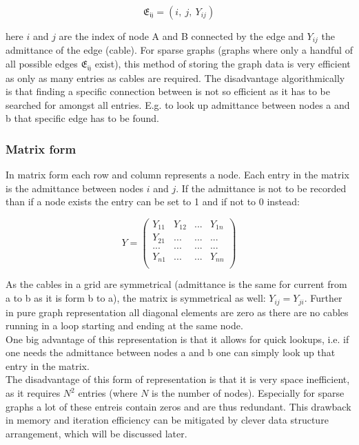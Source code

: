 \begin{equation}    
    \mathfrak{E_{ij}} = (i,\ j,\ Y_{ij})
    \label{eq:graph_theory:edge_list}
\end{equation}

here $i$ and $j$ are the index of node A and B connected by the edge and
$Y_{ij}$ the admittance of the edge (cable).
For sparse graphs (graphs where only a handful of all possible edges $\mathfrak{E_{ij}}$ exist), this method
of storing the graph data is very efficient as only as many entries as cables are required. The disadvantage
algorithmically is that finding a specific connection between is not so efficient as it has to be searched for amongst
all entries. E.g. to look up admittance between nodes a and b that specific edge has to be found.

\subsubsection{Matrix form}

In matrix form each row and column represents a node. Each entry in the matrix is the admittance between nodes $i$ and $j$.
If the admittance is not to be recorded than if a node exists the entry can be set to 1 and if not to 0 instead:

\begin{equation}
    Y =
    \begin{pmatrix}
        Y_{11} & Y_{12} & ... & Y_{1n}\\
        Y_{21} & ...    & ... & ...   \\
        ...    & ...    & ... & ...   \\
        Y_{n1} & ...    & ... & Y_{nn}\\
    \end{pmatrix}
\end{equation}

As the cables in a grid are symmetrical (admittance is the same for current from a to b as it is form b to a), 
the matrix is symmetrical as well: $Y_{ij} = Y_{ji}$. Further in pure graph representation all diagonal elements are
zero as there are no cables running in a loop starting and ending at the same node.\\ 
One big advantage of this representation is that it allows for quick lookups, i.e. if one needs the admittance between nodes a and b
one can simply look up that entry in the matrix.\\
The disadvantage of this form of representation is that it is very space inefficient, as it requires
$N^2$ entries (where $N$ is the number of nodes). Especially for sparse graphs a lot of these entreis contain
zeros and are thus redundant. This drawback in memory and iteration efficiency
can be mitigated by clever data structure arrangement, which will be discussed later. 

